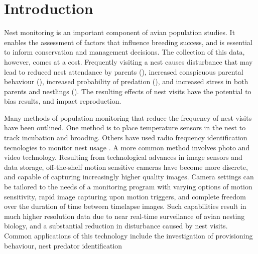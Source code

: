 \section{Introduction}


 

 
 
Nest monitoring is an important component of avian population studies.
It enables the assessment of factors that influence breeding success, and is essential to inform conservation and management decisions.
The collection of this data, however, comes at a cost.
Frequently visiting a nest causes disturbance that may lead to reduced nest attendance by parents (), increased conspicuous parental behaviour (), increased probability of predation (), and increased stress in both parents and nestlings ().
The resulting effects of nest visits have the potential to bias results, and impact reproduction.

 
 
 
 
Many methods of population monitoring that reduce the frequency of nest visits have been outlined.
One method is to place temperature sensors in the nest to track incubation and brooding.
Others have used radio frequency identification tecnologies to monitor nest usage \cite{alba2019ZB}.
A more common method involves photo and video technology.
Resulting from technological advances in image sensors and data storage, off-the-shelf motion sensitive cameras have become more discrete, and capable of capturing increasingly higher quality images.
Camera settings can be tailored to the needs of a monitoring program with varying options of motion sensitivity, rapid image capturing upon motion triggers, and complete freedom over the duration of time between timelapse images. 
Such capabilities result in much higher resolution data due to near real-time surveilance of avian nesting biology, and a substantial reduction in disturbance caused by nest visits.
Common applications of this technology include the investigation of provisioning behaviour, nest predator identification \cite{cox2012LE,degregorio2014EE}

